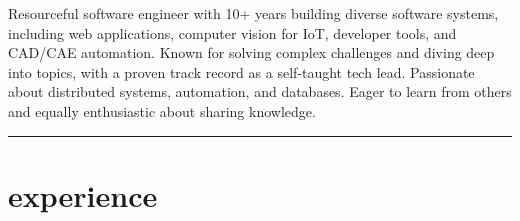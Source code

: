 \documentclass{mycv}
\begin{document}
\header{\phone}{\github}{\email}{\linkedin}

\begin{objective}
    Resourceful software engineer with 10+ years building diverse software systems, including web applications, computer vision for IoT, developer tools, and CAD/CAE automation.
    Known for solving complex challenges and diving deep into topics, with a proven track record as a self-taught tech lead.
    Passionate about distributed systems, automation, and databases.
    Eager to learn from others and equally enthusiastic about sharing knowledge.
\end{objective}

\vspace{-\parskip}\noindent\rule{\textwidth}{0.4pt}

\section{experience}
\end{document}
